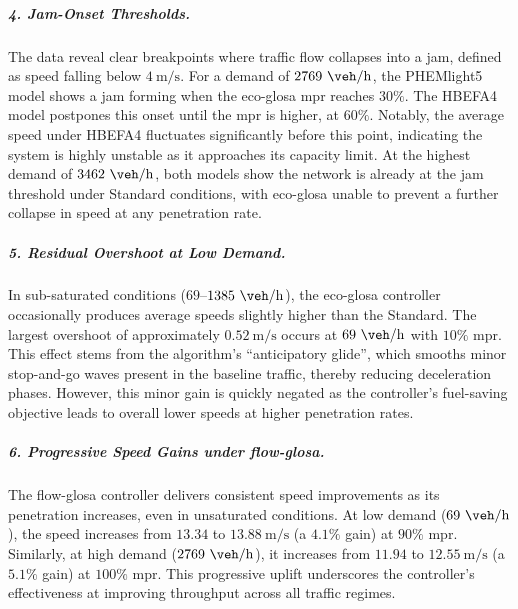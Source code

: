 \subparagraph*{4. Jam-Onset Thresholds.}
The data reveal clear breakpoints where traffic flow collapses into a jam, defined as speed falling below $4~\unit{\metre\per\second}$. For a demand of $2769~\unit{\veh\per\hour}$, the PHEMlight5 model shows a jam forming when the \ac{eco-glosa} \ac{mpr} reaches $30\%$. The HBEFA4 model postpones this onset until the \ac{mpr} is higher, at $60\%$. Notably, the average speed under HBEFA4 fluctuates significantly before this point, indicating the system is highly unstable as it approaches its capacity limit. At the highest demand of $3462~\unit{\veh\per\hour}$, both models show the network is already at the jam threshold under Standard conditions, with \ac{eco-glosa} unable to prevent a further collapse in speed at any penetration rate.

\subparagraph*{5. Residual Overshoot at Low Demand.}
In sub-saturated conditions ($69$--$1385~\unit{\veh\per\hour}$), the \ac{eco-glosa} controller occasionally produces average speeds slightly higher than the Standard. The largest overshoot of approximately $0.52~\unit{\metre\per\second}$ occurs at $69~\unit{\veh\per\hour}$ with $10\%$ \ac{mpr}. This effect stems from the algorithm's \enquote{anticipatory glide}, which smooths minor stop-and-go waves present in the baseline traffic, thereby reducing deceleration phases. However, this minor gain is quickly negated as the controller's fuel-saving objective leads to overall lower speeds at higher penetration rates.

\subparagraph*{6. Progressive Speed Gains under \ac{flow-glosa}.}
The \ac{flow-glosa} controller delivers consistent speed improvements as its penetration increases, even in unsaturated conditions. At low demand ($69~\unit{\veh\per\hour}$), the speed increases from $13.34$ to $13.88~\unit{\metre\per\second}$ (a $4.1\%$ gain) at $90\%$ \ac{mpr}. Similarly, at high demand ($2769~\unit{\veh\per\hour}$), it increases from $11.94$ to $12.55~\unit{\metre\per\second}$ (a $5.1\%$ gain) at $100\%$ \ac{mpr}. This progressive uplift underscores the controller's effectiveness at improving throughput across all traffic regimes.

